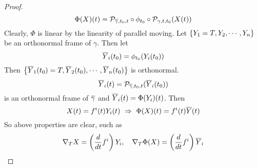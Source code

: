 \begin{enumerate}[label=\arabic{*}.]
\begin{proof}
\begin{equation*}
			\Phi(X)(t) = \mathcal{P}_{\overline{\gamma},t_0,t}\circ\phi_{t_0}\circ\mathcal{P}_{\gamma,t,t_0}(X(t))
		\end{equation*}
		Clearly, $\Phi$ is linear by the linearity of parallel moving. Let $\left\{Y_1=T,Y_2,\cdots,Y_n\right\}$ be an orthonormal frame of $\gamma$. Then let
		\begin{equation*}
			\overline{Y}_i(t_0) = \phi_{t_0}(Y_i(t_0))
		\end{equation*}
		Then $\left\{\overline{Y}_1(t_0)=T,\overline{Y}_2(t_0),\cdots,\overline{Y}_n(t_0)\right\}$ is orthonormal.
		\begin{equation*}
			\overline{Y}_i(t) = \mathcal{P}_{\overline{\gamma},t_0,t}(\overline{Y}_i(t_0))
		\end{equation*}
		is an orthonormal frame of $\overline{\gamma}$ and $\overline{Y}_i(t) = \Phi(Y_i)(t)$. Then
		\begin{equation*}
			X(t) = f^i(t)Y_i(t) ~\Rightarrow~ \Phi(X)(t) = f^i(t)\overline{Y}(t)
		\end{equation*}
		So above properties are clear, such as
		\begin{equation*}
			\nabla_TX = \left(\frac{d}{dt}f^i\right)Y_i,\quad\nabla_T\Phi(X) = \left(\frac{d}{dt}f^i\right)\overline{Y}_i \qedhere
		\end{equation*}
	\end{proof}


\end{enumerate}
